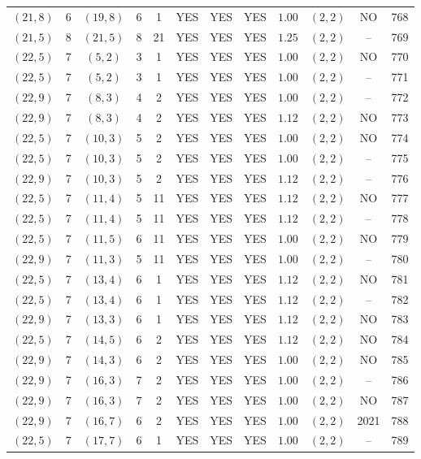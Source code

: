 \begin{longtable}{|c|c|c|c|c|c|c|c|c|c|c|c|}
$(21,8)$ & 6 & $(19,8)$ & 6 & 1 & YES & YES & YES & $1.00$ & $(2,2)$ & NO & 768\\
$(21,5)$ & 8 & $(21,5)$ & 8 & 21 & YES & YES & YES & $1.25$ & $(2,2)$ & -- & 769\\
$(22,5)$ & 7 & $(5,2)$ & 3 & 1 & YES & YES & YES & $1.00$ & $(2,2)$ & NO & 770\\
$(22,5)$ & 7 & $(5,2)$ & 3 & 1 & YES & YES & YES & $1.00$ & $(2,2)$ & -- & 771\\
$(22,9)$ & 7 & $(8,3)$ & 4 & 2 & YES & YES & YES & $1.00$ & $(2,2)$ & -- & 772\\
$(22,9)$ & 7 & $(8,3)$ & 4 & 2 & YES & YES & YES & $1.12$ & $(2,2)$ & NO & 773\\
$(22,5)$ & 7 & $(10,3)$ & 5 & 2 & YES & YES & YES & $1.00$ & $(2,2)$ & NO & 774\\
$(22,5)$ & 7 & $(10,3)$ & 5 & 2 & YES & YES & YES & $1.00$ & $(2,2)$ & -- & 775\\
$(22,9)$ & 7 & $(10,3)$ & 5 & 2 & YES & YES & YES & $1.12$ & $(2,2)$ & -- & 776\\
$(22,5)$ & 7 & $(11,4)$ & 5 & 11 & YES & YES & YES & $1.12$ & $(2,2)$ & NO & 777\\
$(22,5)$ & 7 & $(11,4)$ & 5 & 11 & YES & YES & YES & $1.12$ & $(2,2)$ & -- & 778\\
$(22,5)$ & 7 & $(11,5)$ & 6 & 11 & YES & YES & YES & $1.00$ & $(2,2)$ & NO & 779\\
$(22,9)$ & 7 & $(11,3)$ & 5 & 11 & YES & YES & YES & $1.00$ & $(2,2)$ & -- & 780\\
$(22,5)$ & 7 & $(13,4)$ & 6 & 1 & YES & YES & YES & $1.12$ & $(2,2)$ & NO & 781\\
$(22,5)$ & 7 & $(13,4)$ & 6 & 1 & YES & YES & YES & $1.12$ & $(2,2)$ & -- & 782\\
$(22,9)$ & 7 & $(13,3)$ & 6 & 1 & YES & YES & YES & $1.12$ & $(2,2)$ & NO & 783\\
$(22,5)$ & 7 & $(14,5)$ & 6 & 2 & YES & YES & YES & $1.12$ & $(2,2)$ & NO & 784\\
$(22,9)$ & 7 & $(14,3)$ & 6 & 2 & YES & YES & YES & $1.00$ & $(2,2)$ & NO & 785\\
$(22,9)$ & 7 & $(16,3)$ & 7 & 2 & YES & YES & YES & $1.00$ & $(2,2)$ & -- & 786\\
$(22,9)$ & 7 & $(16,3)$ & 7 & 2 & YES & YES & YES & $1.00$ & $(2,2)$ & NO & 787\\
$(22,9)$ & 7 & $(16,7)$ & 6 & 2 & YES & YES & YES & $1.00$ & $(2,2)$ & 2021 & 788\\
$(22,5)$ & 7 & $(17,7)$ & 6 & 1 & YES & YES & YES & $1.00$ & $(2,2)$ & -- & 789\\

\end{longtable}
